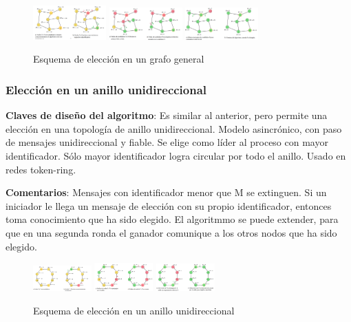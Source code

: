 \begin{figure}[H]
    \centering
    \includegraphics[width=0.25\textwidth]{img/GG_1.png}
    \includegraphics[width=0.25\textwidth]{img/GG_2.png}
    \includegraphics[width=0.25\textwidth]{img/GG_3.png}
    \caption{Esquema de elección en un grafo general}
\end{figure}

\subsubsection{Elección en un anillo unidireccional} 

\textbf{Claves de diseño del algoritmo}: Es similar al anterior, pero permite una elección en una topología de anillo unidireccional. Modelo asincrónico, con paso de mensajes unidireccional y fiable. Se elige como líder al proceso con mayor identificador. Sólo mayor identificador logra circular por todo el anillo. Usado en redes token-ring.

\textbf{Comentarios}: Mensajes con identificador menor que M se extinguen. Si un iniciador le llega un mensaje de elección con su propio identificador, entonces toma conocimiento que ha sido elegido. El algoritmmo se puede extender, para que en una segunda ronda el ganador comunique a los otros nodos que ha sido elegido.

\begin{figure}[H]
    \centering
    \includegraphics[width=0.2\textwidth]{img/AU_1.png}
    \includegraphics[width=0.2\textwidth]{img/AU_2.png}
    \includegraphics[width=0.2\textwidth]{img/AU_3.png}
    \caption{Esquema de elección en un anillo unidireccional}
\end{figure}

